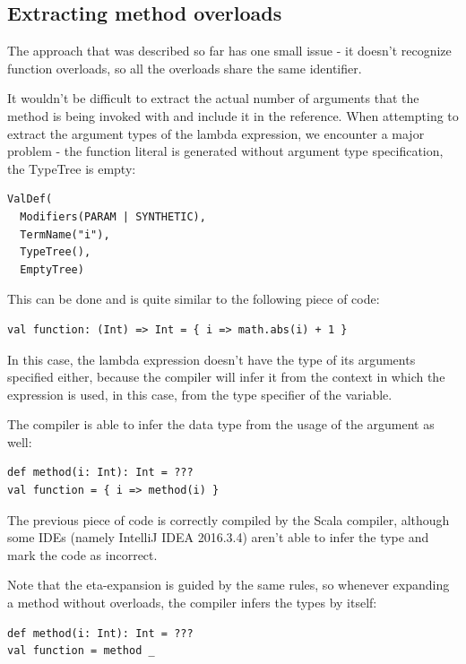 \subsection{Extracting method overloads}

The approach that was described so far has one small issue - it doesn't recognize function overloads, so all the overloads share the same identifier.

 It wouldn't be difficult to extract the actual number of arguments that the method is being invoked with and include it in the reference. When attempting to extract the argument types of the lambda expression, we encounter a major problem - the function literal is generated without argument type specification, the TypeTree is empty:

\lstset{style=Dump}
\begin{lstlisting}
ValDef(
  Modifiers(PARAM | SYNTHETIC), 
  TermName("i"), 
  TypeTree(), 
  EmptyTree)
\end{lstlisting}

This can be done and is quite similar to the following piece of code:

\lstset{style=Scala}
\begin{lstlisting}
val function: (Int) => Int = { i => math.abs(i) + 1 }
\end{lstlisting}

In this case, the lambda expression doesn't have the type of its arguments specified either, because the compiler will infer it from the context in which the expression is used, in this case, from the type specifier of the variable.

The compiler is able to infer the data type from the usage of the argument as well:
\lstset{style=Scala}
\begin{lstlisting}
def method(i: Int): Int = ???
val function = { i => method(i) }
\end{lstlisting}

The previous piece of code is correctly compiled by the Scala compiler, although some IDEs (namely IntelliJ IDEA 2016.3.4) aren't able to infer the type and mark the code as incorrect.

Note that the eta-expansion is guided by the same rules, so whenever expanding a method without overloads, the compiler infers the types by itself:
\lstset{style=Scala}
\begin{lstlisting}
def method(i: Int): Int = ???
val function = method _
\end{lstlisting}

